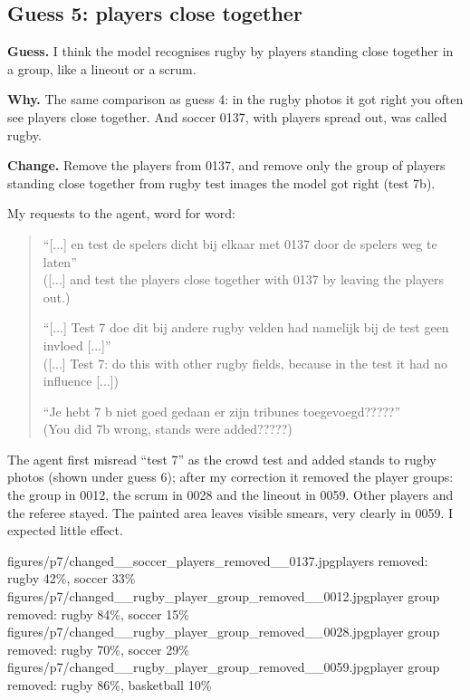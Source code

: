 \documentclass[11pt]{article}
\begin{document}
\subsection*{Guess 5: players close together}

\textbf{Guess.} I think the model recognises rugby by players standing close
together in a group, like a lineout or a scrum.

\textbf{Why.} The same comparison as guess 4: in the rugby photos it got right you
often see players close together. And soccer 0137, with players spread out, was
called rugby.

\textbf{Change.} Remove the players from 0137, and remove only the group of players
standing close together from rugby test images the model got right (test 7b).

My requests to the agent, word for word:
\begin{quote}
``[...] en test de spelers dicht bij elkaar met 0137 door de spelers weg te
laten''\\
([...] and test the players close together with 0137 by leaving the players out.)

``[...] Test 7 doe dit bij andere rugby velden had namelijk bij de test geen invloed
[...]''\\
([...] Test 7: do this with other rugby fields, because in the test it had no
influence [...])

``Je hebt 7 b niet goed gedaan er zijn tribunes toegevoegd?????''\\
(You did 7b wrong, stands were added?????)
\end{quote}

The agent first misread ``test 7'' as the crowd test and added stands to rugby
photos (shown under guess 6); after my correction it removed the player groups:
the group in 0012, the scrum in 0028 and the lineout in 0059. Other players and
the referee stayed. The painted area leaves visible smears, very clearly in 0059.
I expected little effect.

           {figures/p7/changed__soccer_players_removed__0137.jpg}{players removed: rugby 42\%, soccer 33\%}
           {figures/p7/changed__rugby_player_group_removed__0012.jpg}{player group removed: rugby 84\%, soccer 15\%}
           {figures/p7/changed__rugby_player_group_removed__0028.jpg}{player group removed: rugby 70\%, soccer 29\%}
           {figures/p7/changed__rugby_player_group_removed__0059.jpg}{player group removed: rugby 86\%, basketball 10\%}
\end{document}
